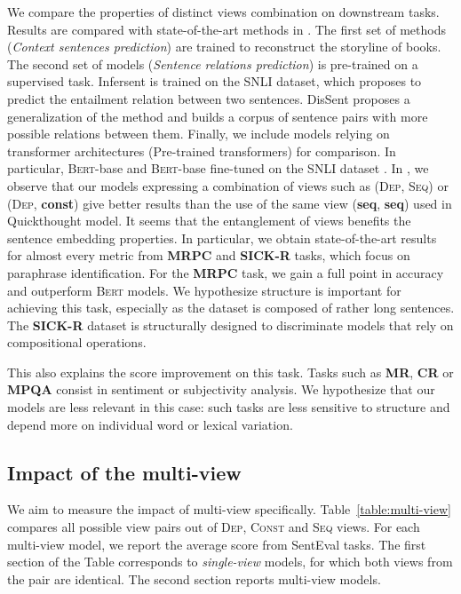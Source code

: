 We compare the properties of distinct views combination on downstream tasks. Results are compared with state-of-the-art methods in . The first set of methods (\textsl{Context sentences prediction}) are trained to reconstruct the storyline of  books. %
The second set of models (\textsl{Sentence relations prediction}) is pre-trained on a supervised task. Infersent \parencite{conneau_17} is trained on the SNLI dataset, which proposes to predict the entailment relation between two sentences. DisSent \parencite{nie_19} proposes a generalization of the method and builds a corpus of sentence pairs with more possible relations between them. Finally, we include models relying on transformer architectures (Pre-trained transformers) for comparison. In particular, \textsc{Bert}-base and \textsc{Bert}-base fine-tuned on the SNLI dataset \parencite{reimers_19}. 
In , we observe that our models expressing a combination of views such as (\textsc{Dep}, \textsc{Seq}) or (\textsc{Dep}, \textbf{const}) give better results than the use of the same view (\textbf{seq}, \textbf{seq}) used in Quickthought model. It seems that the entanglement of views benefits the sentence embedding properties. In particular, we obtain state-of-the-art results for almost every metric from \textbf{MRPC} and \textbf{SICK-R} tasks, which focus on paraphrase identification. For the \textbf{MRPC} task, we gain a full point in accuracy and outperform \textsc{Bert} models. We hypothesize structure is important for achieving this task, especially as the dataset is composed of rather long sentences. The \textbf{SICK-R} dataset is structurally designed to discriminate models that rely on compositional operations. 

This also explains the score improvement on this task. Tasks such as \textbf{MR}, \textbf{CR} or \textbf{MPQA} consist in sentiment or subjectivity analysis. We hypothesize that our models are less relevant in this case: such tasks are less sensitive to structure and depend more on individual word or lexical variation.

\subsection{Impact of the multi-view}

We aim to measure the impact of multi-view specifically. Table~\ref{table:multi-view} compares all possible view pairs out of \textsc{Dep}, \textsc{Const} and \textsc{Seq} views. For each multi-view model, we report the average score from SentEval tasks. The first section of the Table corresponds to \textit{single-view} models, for which both views from the pair are identical. The second section reports multi-view models. 

